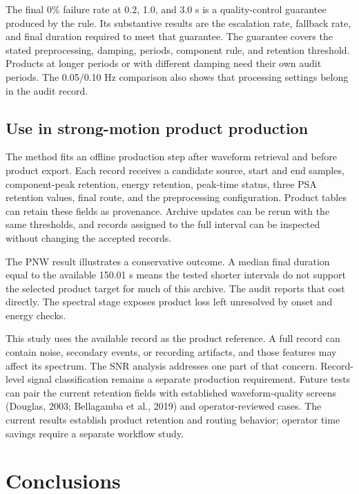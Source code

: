 \documentclass[12pt,letterpaper]{article}
\begin{document}
The final 0\% failure rate at 0.2, 1.0, and 3.0 s is a quality-control guarantee produced by the rule. Its substantive results are the escalation rate, fallback rate, and final duration required to meet that guarantee. The guarantee covers the stated preprocessing, damping, periods, component rule, and retention threshold. Products at longer periods or with different damping need their own audit periods. The 0.05/0.10 Hz comparison also shows that processing settings belong in the audit record.

\subsection{Use in strong-motion product production}\label{use-in-strong-motion-product-production}

The method fits an offline production step after waveform retrieval and before product export. Each record receives a candidate source, start and end samples, component-peak retention, energy retention, peak-time status, three PSA retention values, final route, and the preprocessing configuration. Product tables can retain these fields as provenance. Archive updates can be rerun with the same thresholds, and records assigned to the full interval can be inspected without changing the accepted records.

The PNW result illustrates a conservative outcome. A median final duration equal to the available 150.01 s means the tested shorter intervals do not support the selected product target for much of this archive. The audit reports that cost directly. The spectral stage exposes product loss left unresolved by onset and energy checks.

This study uses the available record as the product reference. A full record can contain noise, secondary events, or recording artifacts, and those features may affect its spectrum. The SNR analysis addresses one part of that concern. Record-level signal classification remains a separate production requirement. Future tests can pair the current retention fields with established waveform-quality screens (Douglas, 2003; Bellagamba et al., 2019) and operator-reviewed cases. The current results establish product retention and routing behavior; operator time savings require a separate workflow study.

\section{Conclusions}\label{conclusions}
\end{document}
